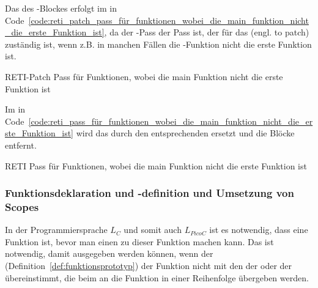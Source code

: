 Das  des -Blockes erfolgt im  in Code~\ref{code:reti_patch_pass_für_funktionen_wobei_die_main_funktion_nicht_die_erste_Funktion_ist}, da der -Pass der Pass ist, der für das  (engl. to patch) zuständig ist, wenn z.B. in manchen Fällen die -Funktion nicht die erste Funktion ist.

\begin{code}
  \centering
  \caption{RETI-Patch Pass für Funktionen, wobei die main Funktion nicht die erste Funktion ist}
  \label{code:reti_patch_pass_für_funktionen_wobei_die_main_funktion_nicht_die_erste_Funktion_ist}
\end{code}

Im  in Code~\ref{code:reti_pass_für_funktionen_wobei_die_main_funktion_nicht_die_erste_Funktion_ist} wird das  durch den entsprechenden   ersetzt und die Blöcke entfernt.

\begin{code}
  \centering
  \caption{RETI Pass für Funktionen, wobei die main Funktion nicht die erste Funktion ist}
  \label{code:reti_pass_für_funktionen_wobei_die_main_funktion_nicht_die_erste_Funktion_ist}
\end{code}

\subsubsection{Funktionsdeklaration und -definition und Umsetzung von Scopes}
\label{sec:funktionsdeklaration_und_definition_und_umsetzung_von_scopes}

In der Programmiersprache $L_C$ und somit auch $L_{PicoC}$ ist es notwendig, dass eine Funktion  ist, bevor man einen  zu dieser Funktion machen kann. Das ist notwendig, damit  ausgegeben werden können, wenn der  (Definition~\ref{def:funktionsprototyp}) der Funktion nicht mit den  der  oder der   übereinstimmt, die beim  an die Funktion in einer  Reihenfolge übergeben werden.


